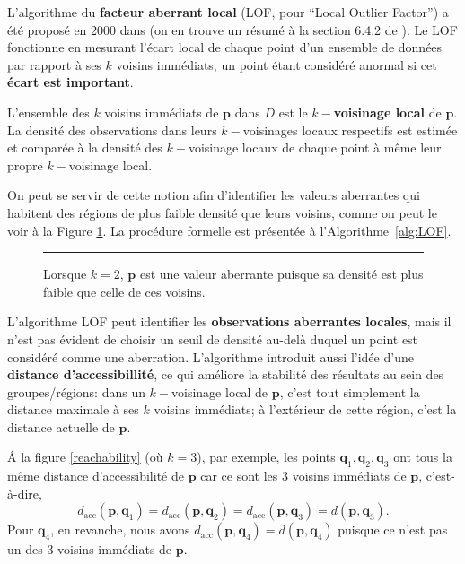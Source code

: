 L'algorithme du \textbf{facteur aberrant local} (LOF, pour ``Local Outlier Factor'') a été proposé en 2000 dans \cite{LOF} (on en trouve un résumé à la section 6.4.2 de \cite{A10}). Le LOF fonctionne en mesurant l'écart local de chaque point d'un ensemble de données par rapport à ses $k$ voisins immédiats, un point étant considéré  anormal si cet \textbf{écart est important}.

L'ensemble des $k$ voisins imm\'ediats de $\mathbf{p}$ dans $D$ est le  \textbf{$k-$voisinage local} de  $\mathbf{p}$. La densité des observations dans leurs $k-$voisinages locaux respectifs est estimée et comparée à la densité des $k-$voisinage locaux de chaque point \`a m\^eme leur propre $k-$voisinage local.

On peut se servir de cette notion afin d'identifier les valeurs aberrantes qui habitent des régions de plus faible densité que leurs voisins, comme on peut le voir \`a la Figure \ref{lofoutlier}. La procédure formelle est pr\'esent\'ee \`a l'Algorithme~\ref{alg:LOF}. 

\begin{figure}[H]
\hrule \vspace{0.4cm}
\centering
{}
\caption{Lorsque $k=2$, $\mathbf{p}$ est une valeur aberrante puisque sa densit\'e est plus faible que celle de ces voisins.}
\label{lofoutlier}
\end{figure}
\noindent L'algorithme LOF peut identifier les \textbf{observations aberrantes locales}, mais il n'est pas \'evident de choisir un seuil de densit\'e au-delà duquel un point est considéré comme une aberration. L'algorithme introduit aussi l'idée d'une \textbf{distance d'accessibillité}, ce qui améliore la stabilité des résultats au sein des groupes/régions: dans un $k-$voisinage local de $\mathbf{p}$, c'est tout simplement la distance maximale à ses $k$ voisins imm\'ediats; \`a l'ext\'erieur de cette région, c'est la distance actuelle de $\mathbf{p}$. 
\par \'A la figure \ref{reachability} (o\`u $k=3$), par exemple, les points $\mathbf{q}_1, \mathbf{q}_2, \mathbf{q}_3$ ont tous la même distance d'accessibilité de $\mathbf{p}$ car ce sont les 3 voisins imm\'ediats de $\mathbf{p}$, c'est-à-dire, 
$$
d_{\text{acc}}(\mathbf{p}, \mathbf{q}_1) 
= d_{\text{acc}}(\mathbf{p}, \mathbf{q}_2)
= d_{\text{acc}}(\mathbf{p}, \mathbf{q}_3)
= d(\mathbf{p}, \mathbf{q}_3)
.$$
Pour $\mathbf{q}_4$, en revanche, nous avons  
$d_{\text{acc}}(\mathbf{p}, \mathbf{q}_4)
= d(\mathbf{p}, \mathbf{q}_4)
$
puisque ce n'est pas un des 3 voisins imm\'ediats de $\mathbf{p}$.

